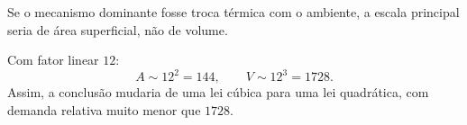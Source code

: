 Se o mecanismo dominante fosse troca térmica com o ambiente, a escala principal seria de área superficial, não de volume.

Com fator linear $12$:
\[
A \sim 12^2 = 144, \qquad V \sim 12^3 = 1728.
\]
Assim, a conclusão mudaria de uma lei cúbica para uma lei quadrática, com demanda relativa muito menor que $1728$.


